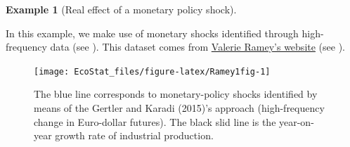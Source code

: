 \documentclass[
  12pt,
]{book}
\newenvironment{Shaded}{\begin{snugshade}}{\end{snugshade}}
\newcommand{\CommentTok}[1]{\textcolor[rgb]{0.56,0.35,0.01}{\textit{#1}}}
\newcommand{\ConstantTok}[1]{\textcolor[rgb]{0.00,0.00,0.00}{#1}}
\newcommand{\ControlFlowTok}[1]{\textcolor[rgb]{0.13,0.29,0.53}{\textbf{#1}}}
\newcommand{\DecValTok}[1]{\textcolor[rgb]{0.00,0.00,0.81}{#1}}
\newcommand{\FunctionTok}[1]{\textcolor[rgb]{0.00,0.00,0.00}{#1}}
\newcommand{\NormalTok}[1]{#1}
\newcommand{\OtherTok}[1]{\textcolor[rgb]{0.56,0.35,0.01}{#1}}
\newcommand{\SpecialCharTok}[1]{\textcolor[rgb]{0.00,0.00,0.00}{#1}}
\theoremstyle{definition}
\theoremstyle{definition}
\newtheorem{example}{Example}[chapter]
\theoremstyle{definition}
\theoremstyle{definition}
\theoremstyle{remark}
\begin{document}
\begin{example}[Real effect of a monetary policy shock]
\protect\hypertarget{exm:Ramey1}{}\label{exm:Ramey1}

In this example, we make use of monetary shocks identified through high-frequency data (see \citet{Gertler_Karadi_2015}). This dataset comes from \href{https://econweb.ucsd.edu/~vramey/research.html}{Valerie Ramey's website} (see \citet{Ramey_2016_NBER}).

\begin{Shaded}
\end{Shaded}

\begin{figure}
\texttt{[image: EcoStat\_files/figure-latex/Ramey1fig-1]} \caption{The blue line corresponds to monetary-policy shocks identified by means of the Gertler and Karadi (2015)'s approach (high-frequency change in Euro-dollar futures). The black slid line is the year-on-year growth rate of industrial production.}\label{fig:Ramey1fig}
\end{figure}


\end{example}
\end{document}

